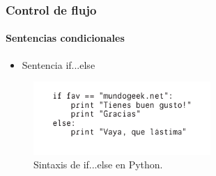 \begin{frame}[fragile]
  \frametitle{Control de flujo}

    \framesubtitle{Sentencias condicionales}    
  
  \begin{itemize}
    \item Sentencia if...else
  \end{itemize}

  \begin{figure}
    \includegraphics[width=0.6\textwidth]{Imagenes/IfElse.jpg}
    \caption{\label{fig:Ejemplo5}Sintaxis de if...else en Python.}
  \end{figure}

\end{frame}
